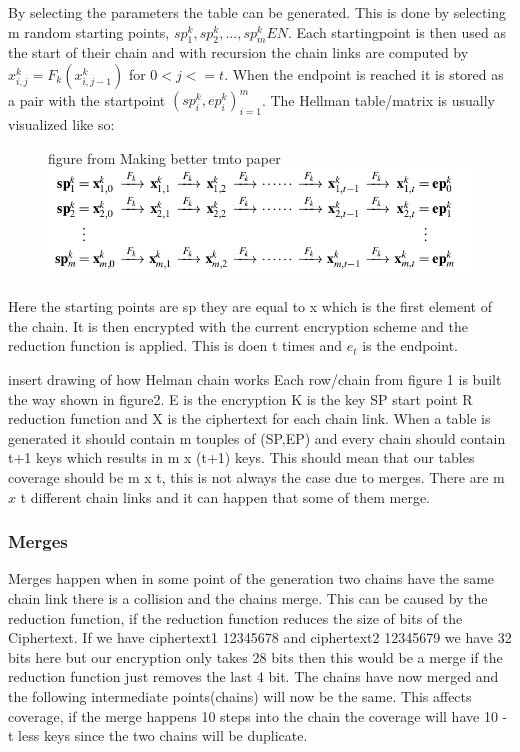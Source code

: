 By selecting the parameters the table can be generated. This is done by selecting m random starting points, $ sp^{k}_1,sp^{k}_2,...,sp^{k}_m E N$. Each startingpoint is then used as the start of their chain and with recursion the chain links are computed by $ x^{k}_{i,j}=F_k( x^{k}_{i,j-1})$ for $0<j<=t$. When the endpoint is reached it is stored as a pair with the startpoint ${( sp^{k}_{i}, ep^{k}_{i})}^{m}_{i=1}$.
The Hellman table/matrix is usually visualized like so:
\\
\begin{figure}[t]
  figure from Making better tmto paper
  \includegraphics[width=\textwidth]{figures/HellmanMatrix.png}
  \centering
\end{figure}

Here the starting points are sp they are equal to x which is the first element of the chain. It is then encrypted with the current encryption scheme and the reduction function is applied. This is doen t times and $e_t$ is the endpoint.

insert drawing of how Helman chain works
Each row/chain from figure 1 is built the way shown in figure2. E is the encryption K is the key SP start point R reduction function and X is the ciphertext for each chain link. When a table is generated it should contain m touples of (SP,EP) and every chain should contain t+1 keys which results in m x (t+1) keys. This should mean that our tables coverage should be m x t, this is not always the case due to merges.
There are m $x$ t different chain links and it can happen that some of them merge.


\subsubsection{Merges}
Merges happen when in some point of the generation two chains have the same chain link there is a collision and the chains merge. This can be caused by the reduction function, if the reduction function reduces the size of bits of the Ciphertext. If we have ciphertext1 12345678 and ciphertext2 12345679 we have 32 bits here but our encryption only takes 28 bits then this would be a merge if the reduction function just removes the last 4 bit. The chains have now merged and the following intermediate points(chains) will now be the same. This affects coverage, if the merge happens 10 steps into the chain the coverage  will have 10 - t less keys since the two chains will be duplicate.

